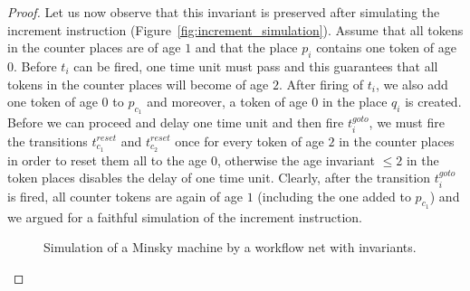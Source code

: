 \begin{proof}
Let us now observe
that this invariant is preserved after simulating the 
increment instruction (Figure~\ref{fig:increment_simulation}).
Assume that all tokens in the counter places are of age $1$ and that
the place $p_i$ contains one token of age $0$.
Before $t_i$ can be fired, one time unit must pass and this guarantees
that all tokens in the counter places will become of age $2$. After firing
of $t_i$, we also add one token of age $0$ to $p_{c_1}$ 
and moreover, a token of age $0$ in the place $q_i$ is created.
Before we can proceed and delay one time unit 
and then fire $t_i^{\mathit goto}$, we must fire the
transitions $t_{c_1}^{\mathit reset}$ and $t_{c_2}^{\mathit reset}$ once
for every token of age $2$ in the counter places in order to reset 
them all to the age $0$, otherwise the age invariant $\leq 2$ in the token 
places disables the delay of one time unit. Clearly, after the transition 
$t_i^{\mathit goto}$ is fired, all counter tokens are again of age $1$
(including the one added to $p_{c_1}$) and we argued for a faithful simulation
of the increment instruction.

\begin{figure}[h]
\captionsetup[figure]{position=above}
\caption{Simulation of a Minsky machine by a workflow net with invariants.\label{fig:cont}}
\begin{center}
\begin{minipage}[c]{\textwidth}
\centering
{}
  \end{minipage}


\end{center}
\end{figure}
\end{proof}
